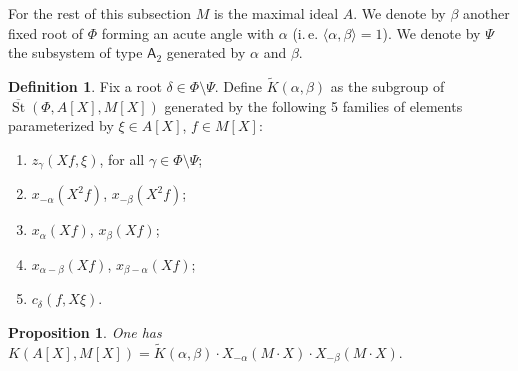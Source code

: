 \documentclass[oneside, 8pt]{amsart}
\newtheorem{prop}[lemma]{Proposition}
\theoremstyle{remark}
\theoremstyle{definition}
\numberwithin{lemma}{section}
\numberwithin{prop}{section}
\numberwithin{corollary}{section}
\numberwithin{externaltheorem}{section}
\newtheorem{df}[lemma]{Definition} \Crefname{df}{Definition}{Definitions}
\DeclareMathOperator{\St}{St}
\newcommand{\rA}{\mathsf{A}}
\numberwithin{equation}{section}
\begin{document}
For the rest of this subsection $M$ is the maximal ideal $A$.
We denote by $\beta$ another fixed root of $\Phi$ forming an acute angle with $\alpha$ (i.\,e. $\langle \alpha, \beta \rangle = 1$). We denote by $\Psi$ the subsystem of type $\rA_2$ generated by $\alpha$ and $\beta$.
\begin{df}\label{def:Kab} 
Fix a root $\delta \in \Phi \setminus \Psi$. Define $\widetilde{K}(\alpha, \beta)$ as the subgroup of $\overline{\St}(\Phi, A[X], M[X])$ generated by the following 5 families of elements parameterized by $\xi \in A[X]$, $f\in M[X]$:
 \begin{enumerate}[label=(K\arabic*)]
  \item $z_\gamma(Xf, \xi)$, for all $\gamma \in \Phi \setminus \Psi$;
  \item $x_{-\alpha}(X^2f)$, $x_{-\beta}(X^2f)$;
  \item $x_{\alpha}(Xf)$, $x_\beta(Xf)$;
  \item $x_{\alpha-\beta}(Xf)$, $x_{\beta-\alpha}(Xf)$;
  \item $c_{\delta}(f, X\xi)$. \end{enumerate} \end{df}
\begin{prop} \label{K-a-b} One has $K(A[X], M[X]) = \widetilde{K}(\alpha, \beta) \cdot X_{-\alpha}(M \cdot X) \cdot X_{-\beta}(M \cdot X).$
\end{prop} 
\end{document}
